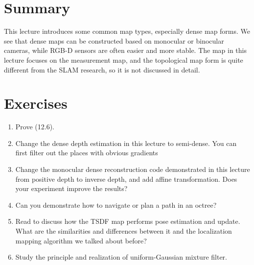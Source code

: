 \section{Summary}
This lecture introduces some common map types, especially dense map forms. We see that dense maps can be constructed based on monocular or binocular cameras, while RGB-D sensors are often easier and more stable. The map in this lecture focuses on the measurement map, and the topological map form is quite different from the SLAM research, so it is not discussed in detail.

\section*{Exercises}
\begin{enumerate}
	\item Prove (12.6).
	\item Change the dense depth estimation in this lecture to semi-dense. You can first filter out the places with obvious gradients
	\item[\optional] Change the monocular dense reconstruction code demonstrated in this lecture from positive depth to inverse depth, and add affine transformation. Does your experiment improve the results?
	\item Can you demonstrate how to navigate or plan a path in an octree?
	\item Read \cite{Newcombe2011} to discuss how the TSDF map performs pose estimation and update. What are the similarities and differences between it and the localization mapping algorithm we talked about before?
	\item[\optional] Study the principle and realization of uniform-Gaussian mixture filter.
\end{enumerate}
